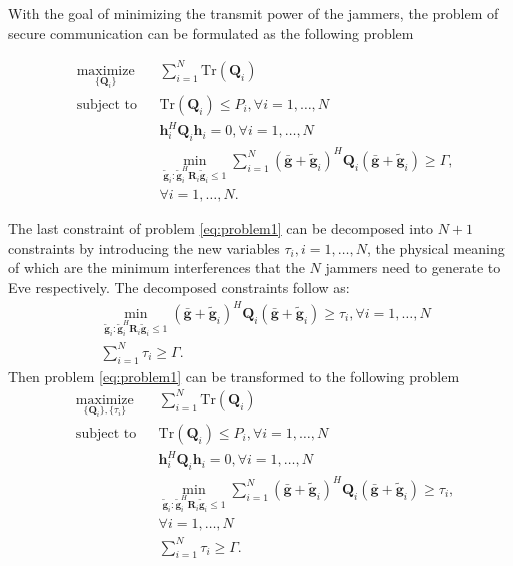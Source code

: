 \documentclass[conference]{IEEEtran}
\begin{document}
With the goal of minimizing the transmit power of the jammers, the problem of secure communication can be formulated as the following problem

\begin{equation}
\begin{aligned} \label{eq:problem1}
& \underset{\{\mathbf{Q}_i\}}{\text{maximize}}
& & \sum_{i = 1}^{N}\mathrm{Tr}(\mathbf{Q}_i) \\
& \text{subject to}
& & \mathrm{Tr}(\mathbf{Q}_i) \leq P_i, \forall i = 1, \ldots, N\\
&&& \mathbf{h}_i^H \mathbf{Q}_i \mathbf{h}_i= 0, \forall i = 1,\ldots,N\\
&&& \min_{\tilde{\mathbf{g}}_i: \tilde{\mathbf{g}}_i^H \mathbf{R}_i\tilde{\mathbf{g}}_i \leq 1}\sum_{i=1}^{N}(\bar{\mathbf{g}}+\tilde{\mathbf{g}}_i)^H\mathbf{Q}_i(\bar{\mathbf{g}}+\tilde{\mathbf{g}}_i) \geq  \Gamma,\\
&&& \forall i = 1, \ldots, N.
\end{aligned}
\end{equation}


The last constraint of problem \eqref{eq:problem1} can be decomposed into $N+1$ constraints by introducing the new variables $\tau_i, i =1,\ldots,N$, the physical meaning of which are the minimum interferences that the $N$ jammers need to generate to Eve respectively. The decomposed constraints follow as:
\begin{eqnarray}
&\underset{\tilde{\mathbf{g}}_i: \tilde{\mathbf{g}}_i^H \mathbf{R}_i\tilde{\mathbf{g}}_i \leq 1}\min(\bar{\mathbf{g}}+\tilde{\mathbf{g}}_i)^H\mathbf{Q}_i(\bar{\mathbf{g}}+\tilde{\mathbf{g}}_i) \geq  \tau_i, \forall i = 1,\ldots,N\label{eq:artificial noise constraint decomposed}\nonumber\\
&\sum_{i =1}^{N}\tau_i \geq \Gamma.
\end{eqnarray}
Then problem \eqref{eq:problem1} can be transformed to the following problem
\begin{equation}
\begin{aligned} \label{eq:problem2}
& \underset{\{\mathbf{Q}_i\},\{\tau_i\}}{\text{maximize}}
& & \sum_{i = 1}^{N}\mathrm{Tr}(\mathbf{Q}_i) \\
& \text{subject to}
& & \mathrm{Tr}(\mathbf{Q}_i) \leq P_i, \forall i = 1, \ldots, N\\
&&& \mathbf{h}_i^H \mathbf{Q}_i \mathbf{h}_i= 0, \forall i = 1,\ldots,N\\
&&& \min_{\tilde{\mathbf{g}}_i: \tilde{\mathbf{g}}_i^H \mathbf{R}_i\tilde{\mathbf{g}}_i \leq 1}\sum_{i=1}^{N}(\bar{\mathbf{g}}+\tilde{\mathbf{g}}_i)^H\mathbf{Q}_i(\bar{\mathbf{g}}+\tilde{\mathbf{g}}_i) \geq  \tau_i,\\
&&&\forall i = 1,\ldots,N\\
&&&\sum_{i =1}^{N}\tau_i \geq \Gamma.
\end{aligned}
\end{equation}
\end{document}

